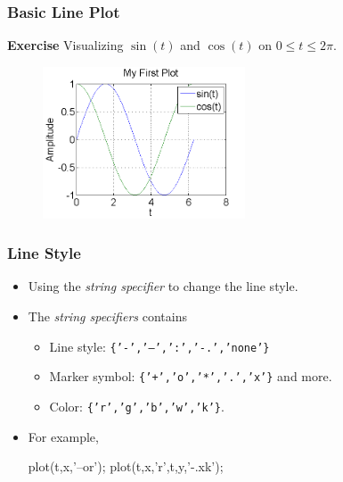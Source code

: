 \documentclass{beamer}  %
\begin{document}
\begin{frame}[fragile]
\frametitle{Basic Line Plot}
\textbf{Exercise}
Visualizing $\sin(t)$ and $\cos(t)$ on $0 \leq t \leq 2\pi$. \pause
\begin{figure}[htb]
        \centering
      \includegraphics[width=6cm]{basic_plot_sine}
\end{figure}

\end{frame}
\begin{frame}[fragile]
\frametitle{Line Style}

\begin{itemize}[<+->]
    \item Using the \textit{string specifier} to change the line style.
    \item The \textit{string specifiers} contains
          \begin{itemize}
          \item Line style: \texttt{\{'-','--',':','-.','none'\}}
          \item Marker symbol: \texttt{\{'+','o','*','.','x'\}} and more.
          \item Color: \texttt{\{'r','g','b','w','k'\}}.
          \end{itemize}
    \item For example,
          \begin{matlabcode}[numbers=none,frame=none]
          plot(t,x,'--or');
          plot(t,x,'r',t,y,'-.xk');
          \end{matlabcode}

\end{itemize}

\end{frame}
\end{document}
